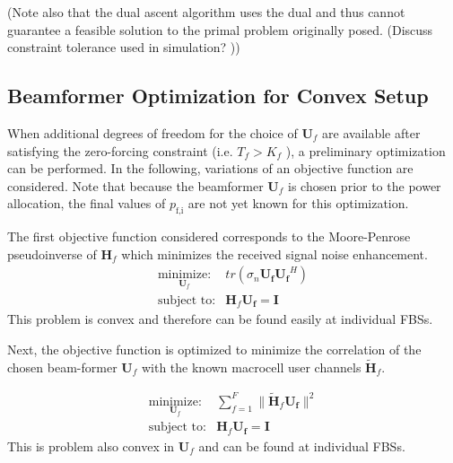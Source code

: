 \documentclass[12pt,a4paper]{report}
\begin{document}
(Note also that the dual ascent algorithm uses the dual and thus cannot guarantee a feasible solution to the primal problem originally posed. (Discuss constraint tolerance used in simulation? ))

\subsection{Beamformer Optimization for Convex Setup}
When additional degrees of freedom for the choice of $\mathbf{U}_{f}$ are available after satisfying the zero-forcing constraint (i.e. $T_{f}> K_{f}$ ), a preliminary optimization can be performed. In the following, variations of an objective function are considered. Note that because the beamformer $\mathbf{U}_{f}$ is chosen prior to the power allocation, the final values of $p_{\text{f,i}}$ are not yet known for this optimization. 
\par
The first objective function considered corresponds to the Moore-Penrose pseudoinverse of $\mathbf{H}_{f}$ which minimizes the received signal noise enhancement. 
    \begin{equation}
    \begin{array}{ll}
    \underset{\mathbf{U}_{f} }{\text{minimize:}}   & tr(\sigma_n\mathbf{U_{f}}  \mathbf{U_{f}}^H)
    \\
    \mbox{subject to:} & \mathbf{H}_{f}  \mathbf{U_{f}} = \mathbf{I}
    \end{array}
    \label{e-opt-prob}
    \end{equation}
    This problem is convex and therefore can be found easily at individual FBSs. 

    \par
Next, the objective function is optimized to minimize the correlation of the chosen beam-former $\mathbf{U}_{f}$ with the known macrocell user channels $\mathbf{\tilde{H}}_{f}$.

    \begin{equation}
    \begin{array}{ll}
    \underset{\mathbf{U}_{f} }{\text{minimize:}}   & \sum^F_{f=1} \|\mathbf{\tilde{H}}_{f}  \mathbf{U_{f}}\|^2
    \\
    \mbox{subject to:} & \mathbf{H}_{f} \mathbf{U_{f}} = \mathbf{I}
    \end{array}
    \label{e-opt-prob}
    \end{equation}
This is problem also convex in $\mathbf{U}_{f}$ and can be found at individual FBSs.
\end{document}
